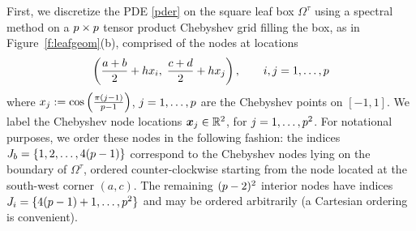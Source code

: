 \documentclass[11pt,final]{amsart}
\theoremstyle{definition}
\numberwithin{remark}{section}
\numberwithin{definition}{section}
\numberwithin{pro}{section}
\begin{document}
First, we discretize the PDE \eqref{pder} on the square leaf box $\Omega^\tau$
using a  spectral method on a
$p\times p$ tensor product Chebyshev grid filling the box,
as in Figure~\ref{f:leafgeom}(b),
comprised of the nodes at locations
$$\left(\frac{a+b}{2}+hx_i, \;\frac{c+d}{2}+hx_j \right), \qquad i,j = 1,\ldots,p$$
where $x_j := \cos\left(\frac{\pi (j-1)}{p-1}\right)$, $j = 1,\ldots,p$ are the
Chebyshev points on $[-1,1]$.
We label the Chebyshev node locations $\bm{x}_j\in\mathbb{R}^2$, for $j=1,\ldots,p^2$.
For notational purposes, we order these nodes in the following fashion:
the indices $J_b = \{1,2,\ldots, 4(p-1)\}$ correspond to the Chebyshev
nodes lying on the
boundary of $\Omega^\tau$, ordered counter-clockwise starting from
the node located at the south-west corner $(a,c)$.
The remaining $(p-2)^2$ interior nodes have indices $J_i = \{4(p-1)+1, \ldots, p^2\}$ and
may be ordered arbitrarily (a Cartesian ordering is convenient).
\end{document}
